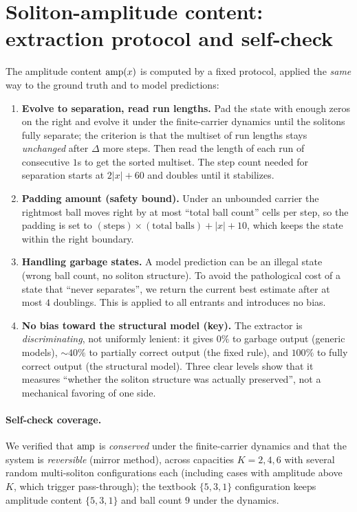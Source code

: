 \documentclass[11pt]{article}
\theoremstyle{definition}
\theoremstyle{plain}
\begin{document}
\section{Soliton-amplitude content: extraction protocol and self-check}\label{app:metric}
The amplitude content $\mathrm{amp}(x)$ is computed by a fixed protocol, applied the \emph{same} way to the
ground truth and to model predictions:

\begin{enumerate}
\item \textbf{Evolve to separation, read run lengths.} Pad the state with enough zeros on the right and
      evolve it under the finite-carrier dynamics until the solitons fully separate; the criterion is
      that the multiset of run lengths stays \emph{unchanged} after $\Delta$ more steps. Then read the
      length of each run of consecutive $1$s to get the sorted multiset. The step count needed for
      separation starts at $2|x|+60$ and doubles until it stabilizes.
\item \textbf{Padding amount (safety bound).} Under an unbounded carrier the rightmost ball moves right
      by at most ``total ball count'' cells per step, so the padding is set to
      $(\text{steps})\times(\text{total balls})+|x|+10$, which keeps the state within the right boundary.
\item \textbf{Handling garbage states.} A model prediction can be an illegal state (wrong ball count, no
      soliton structure). To avoid the pathological cost of a state that ``never separates'', we return
      the current best estimate after at most $4$ doublings. This is applied to all entrants and
      introduces no bias.
\item \textbf{No bias toward the structural model (key).} The extractor is \emph{discriminating}, not
      uniformly lenient: it gives $0\%$ to garbage output (generic models), $\sim40\%$ to partially
      correct output (the fixed rule), and $100\%$ to fully correct output (the structural model). Three
      clear levels show that it measures ``whether the soliton structure was actually preserved'', not a
      mechanical favoring of one side.
\end{enumerate}

\paragraph{Self-check coverage.} We verified that $\mathrm{amp}$ is \emph{conserved} under the finite-carrier
dynamics and that the system is \emph{reversible} (mirror method), across capacities $K=2,4,6$ with
several random multi-soliton configurations each (including cases with amplitude above $K$, which trigger
pass-through); the textbook $\{5,3,1\}$ configuration keeps amplitude content $\{5,3,1\}$ and ball count
$9$ under the dynamics.
\end{document}
